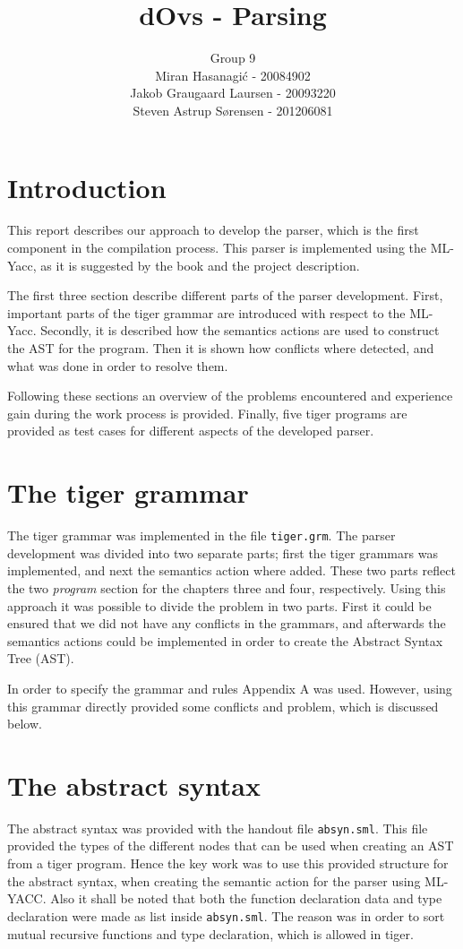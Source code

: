 \documentclass{article}
\title{dOvs - Parsing}
\author{
  Group 9 \\
  Miran Hasanagi\'{c} - 20084902 \\
  Jakob Graugaard Laursen - 20093220\\
  Steven Astrup S\o rensen - 201206081
}
\begin{document}
\maketitle

\section{Introduction}
This report describes our approach to develop the parser, which is the first component in the compilation process. This parser is implemented using the ML-Yacc, as it is suggested by the book and the project description.

The first three section describe different parts of the parser development.
First, important parts of the tiger grammar are introduced with respect to the ML-Yacc. Secondly, it is described how the semantics actions are used to construct the AST for the program. Then it is shown how conflicts where detected, and what was done in order to resolve them.

Following these sections an overview of the problems encountered and experience gain during the work process is provided. Finally, five tiger programs are provided as test cases for different aspects of the developed parser.

\section{The tiger grammar}

The tiger grammar was implemented in the file \texttt{tiger.grm}. The parser development was divided into two separate parts; first the tiger grammars was implemented, and next the semantics action where added. These two parts reflect the two \textit{program} section for the chapters three and four, respectively. Using this approach it was possible to divide the problem in two parts. First it could be ensured that we did not have any conflicts in the grammars, and afterwards the semantics actions could be implemented in order to create the Abstract Syntax Tree (AST). 

In order to specify the grammar and rules Appendix A was used. However, using this grammar directly provided some conflicts and problem, which is discussed below.  

\section{The abstract syntax}
The abstract syntax was provided with the handout file \texttt{absyn.sml}. This file provided the types of the different nodes that can be used when creating an AST from a tiger program.  Hence the key work was to use this provided structure for the abstract syntax, when creating the semantic action for the parser using ML-YACC. Also it shall be noted that both the function declaration data and type declaration were made as list inside \texttt{absyn.sml}. The reason was in order to sort mutual recursive functions and type declaration, which is allowed in tiger.
\end{document}
